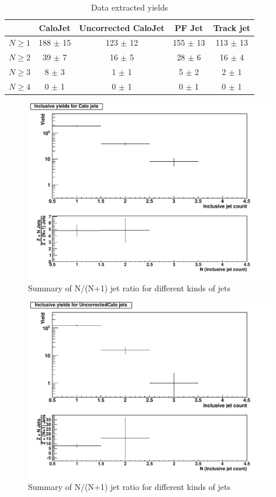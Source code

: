 \documentclass[10pt,a4paper,onecolumn]{article}
\begin{document}
\begin{table}
\caption{Data extracted yields}
\centering
   \begin{tabular}{|c|c|c|c|c|}
      \hline
      & CaloJet & Uncorrected CaloJet & PF Jet & Track jet \\\hline
      $N \ge 1$ & 188 $\pm$ 15 & 123 $\pm$ 12 & 155 $\pm$ 13 & 113 $\pm$ 13 \\\hline
      $N \ge 2$ & 39 $\pm$ 7 & 16 $\pm$ 5 & 28 $\pm$ 6 & 16 $\pm$ 4 \\\hline
      $N \ge 3$ & 8 $\pm$ 3 & 1 $\pm$ 1 & 5 $\pm$ 2 & 2 $\pm$ 1 \\\hline
      $N \ge 4$ & 0 $\pm$ 1 & 0 $\pm$ 1 & 0 $\pm$ 1 & 0 $\pm$ 1 \\\hline
   \end{tabular}
   \label{Table_DataExtractedYields}
\end{table}

\begin{figure}
   \includegraphics[width=110mm]{FinalPlot_FloatAll_Calo.pdf}
   \caption{Summary of N/(N+1) jet ratio for different kinds of jets}
   \label{Figure_RatioFromDataCaloJet}
\end{figure}

\begin{figure}
   \includegraphics[width=110mm]{FinalPlot_FloatAll_UncorrectedCalo.pdf}
   \caption{Summary of N/(N+1) jet ratio for different kinds of jets}
   \label{Figure_RatioFromDataUncorrectedCaloJet}
\end{figure}
\end{document}
